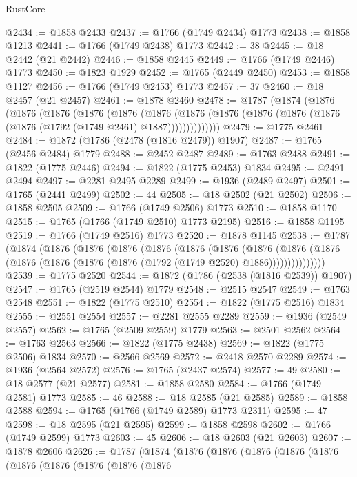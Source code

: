 \begin{lexlean}{RustCore}
\begin{coremodule}
@2434 := @1858 @2433
@2437 := @1766 (@1749 @2434) @1773
@2438 := @1858 @1213
@2441 := @1766 (@1749 @2438) @1773
@2442 := 38
@2445 := @18 @2442 (@21 @2442)
@2446 := @1858 @2445
@2449 := @1766 (@1749 @2446) @1773
@2450 := @1823 @1929
@2452 := @1765 (@2449 @2450)
@2453 := @1858 @1127
@2456 := @1766 (@1749 @2453) @1773
@2457 := 37
@2460 := @18 @2457 (@21 @2457)
@2461 := @1878 @2460
@2478 := @1787
    (@1874
      (@1876
        (@1876
          (@1876
            (@1876
              (@1876
                (@1876
                  (@1876 (@1876 (@1876 (@1876 (@1876 (@1876 (@1792 (@1749 @2461) @1887))))))))))))))
@2479 := @1775 @2461
@2484 := @1872 (@1786 (@2478 (@1816 @2479)) @1907)
@2487 := @1765 (@2456 @2484) @1779
@2488 := @2452 @2487
@2489 := @1763 @2488
@2491 := @1822 (@1775 @2446)
@2494 := @1822 (@1775 @2453) @1834
@2495 := @2491 @2494
@2497 := @2281 @2495 @2289
@2499 := @1936 (@2489 @2497)
@2501 := @1765 (@2441 @2499)
@2502 := 44
@2505 := @18 @2502 (@21 @2502)
@2506 := @1858 @2505
@2509 := @1766 (@1749 @2506) @1773
@2510 := @1858 @1170
@2515 := @1765 (@1766 (@1749 @2510) @1773 @2195)
@2516 := @1858 @1195
@2519 := @1766 (@1749 @2516) @1773
@2520 := @1878 @1145
@2538 := @1787
    (@1874
      (@1876
        (@1876
          (@1876
            (@1876
              (@1876
                (@1876
                  (@1876
                    (@1876
                      (@1876 (@1876 (@1876 (@1876 (@1876 (@1792 (@1749 @2520) @1886)))))))))))))))
@2539 := @1775 @2520
@2544 := @1872 (@1786 (@2538 (@1816 @2539)) @1907)
@2547 := @1765 (@2519 @2544) @1779
@2548 := @2515 @2547
@2549 := @1763 @2548
@2551 := @1822 (@1775 @2510)
@2554 := @1822 (@1775 @2516) @1834
@2555 := @2551 @2554
@2557 := @2281 @2555 @2289
@2559 := @1936 (@2549 @2557)
@2562 := @1765 (@2509 @2559) @1779
@2563 := @2501 @2562
@2564 := @1763 @2563
@2566 := @1822 (@1775 @2438)
@2569 := @1822 (@1775 @2506) @1834
@2570 := @2566 @2569
@2572 := @2418 @2570 @2289
@2574 := @1936 (@2564 @2572)
@2576 := @1765 (@2437 @2574)
@2577 := 49
@2580 := @18 @2577 (@21 @2577)
@2581 := @1858 @2580
@2584 := @1766 (@1749 @2581) @1773
@2585 := 46
@2588 := @18 @2585 (@21 @2585)
@2589 := @1858 @2588
@2594 := @1765 (@1766 (@1749 @2589) @1773 @2311)
@2595 := 47
@2598 := @18 @2595 (@21 @2595)
@2599 := @1858 @2598
@2602 := @1766 (@1749 @2599) @1773
@2603 := 45
@2606 := @18 @2603 (@21 @2603)
@2607 := @1878 @2606
@2626 := @1787
    (@1874
      (@1876
        (@1876
          (@1876
            (@1876
              (@1876
                (@1876
                  (@1876
                    (@1876
                      (@1876
                        (@1876

\end{coremodule}
\end{lexlean}
